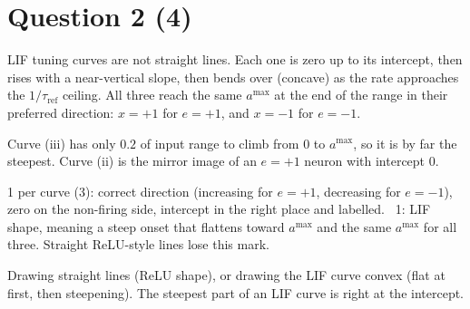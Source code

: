 \documentclass[11pt,letterpaper]{article}
\newcommand{\tref}{\tau_{\mathrm{ref}}}
\newcommand{\trc}{\tau_{RC}}
\begin{document}
\section*{Question 2 \hfill (4)}
LIF tuning curves are not straight lines. Each one is zero up to its intercept, then rises with a near-vertical slope, then bends over (concave) as the rate approaches the $1/\tref$ ceiling. All three reach the same $a^{\max}$ at the end of the range in their preferred direction: $x = +1$ for $e = +1$, and $x = -1$ for $e = -1$.
\begin{center}
\end{center}
Curve (iii) has only $0.2$ of input range to climb from $0$ to $a^{\max}$, so it is by far the steepest. Curve (ii) is the mirror image of an $e = +1$ neuron with intercept $0$.
\begin{marking}
1 per curve (3): correct direction (increasing for $e = +1$, decreasing for $e = -1$), zero on the non-firing side, intercept in the right place and labelled. \ 1: LIF shape, meaning a steep onset that flattens toward $a^{\max}$ and the same $a^{\max}$ for all three. Straight ReLU-style lines lose this mark.
\end{marking}
\begin{trap}
Drawing straight lines (ReLU shape), or drawing the LIF curve convex (flat at first, then steepening). The steepest part of an LIF curve is right at the intercept.
\end{trap}
\end{document}
